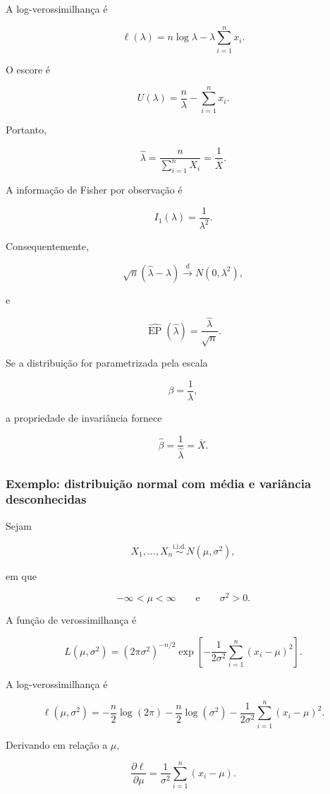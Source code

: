 \documentclass[
  letterpaper,
  DIV=11,
  numbers=noendperiod]{scrreprt}
\begin{document}
A log-verossimilhança é

\[\ell(\lambda)
=
n\log\lambda
-
\lambda
\sum_{i=1}^n x_i.\]

O escore é

\[U(\lambda)
=
\frac{n}{\lambda}
-
\sum_{i=1}^n x_i.\]

Portanto,

\[\widehat\lambda
=
\frac{n}{
\sum_{i=1}^n X_i
}
=
\frac{1}{\overline X}.\]

A informação de Fisher por observação é

\[I_1(\lambda)
=
\frac{1}{\lambda^2}.\]

Consequentemente,

\[\sqrt n
(\widehat\lambda-\lambda)
\xrightarrow{d}
N(0,\lambda^2),\]

e

\[\widehat{\operatorname{EP}}
(\widehat\lambda)
=
\frac{\widehat\lambda}{\sqrt n}.\]

Se a distribuição for parametrizada pela escala

\[\beta
=
\frac{1}{\lambda},\]

a propriedade de invariância fornece

\[\widehat\beta
=
\frac{1}{\widehat\lambda}
=
\overline X.\]

\subsubsection{Exemplo: distribuição normal com média e variância
desconhecidas}\label{exemplo-distribuiuxe7uxe3o-normal-com-muxe9dia-e-variuxe2ncia-desconhecidas}

Sejam

\[X_1,\ldots,X_n
\overset{\mathrm{i.i.d.}}{\sim}
N(\mu,\sigma^2),\]

em que

\[-\infty<\mu<\infty
\qquad\text{e}\qquad
\sigma^2>0.\]

A função de verossimilhança é

\[L(\mu,\sigma^2)
=
(2\pi\sigma^2)^{-n/2}
\exp
\left[
-\frac{1}{2\sigma^2}
\sum_{i=1}^n
(x_i-\mu)^2
\right].\]

A log-verossimilhança é

\[\ell(\mu,\sigma^2)
=
-\frac{n}{2}\log(2\pi)
-\frac{n}{2}\log(\sigma^2)
-\frac{1}{2\sigma^2}
\sum_{i=1}^n
(x_i-\mu)^2.\]

Derivando em relação a \(\mu\),

\[\frac{\partial\ell}{\partial\mu}
=
\frac{1}{\sigma^2}
\sum_{i=1}^n
(x_i-\mu).\]
\end{document}
